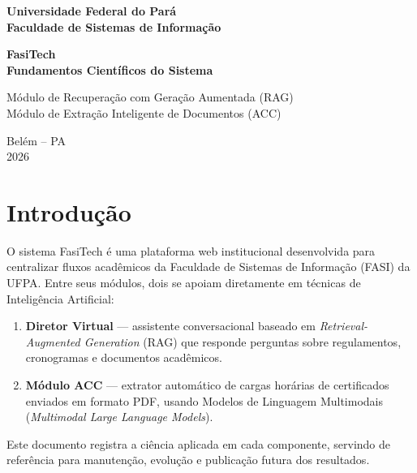 \documentclass[12pt,a4paper]{report}
\begin{document}
\begin{titlepage}
  \centering
  \vspace*{2cm}
  {\Large\bfseries Universidade Federal do Pará\\
  Faculdade de Sistemas de Informação\par}
  \vspace{3cm}
  {\Huge\bfseries FasiTech\\[0.5em]
  \large Fundamentos Científicos do Sistema\par}
  \vspace{2cm}
  {\large
  Módulo de Recuperação com Geração Aumentada (RAG)\\
  Módulo de Extração Inteligente de Documentos (ACC)
  \par}
  \vfill
  {\large Belém -- PA\\2026}
\end{titlepage}

\tableofcontents
\clearpage

\chapter{Introdução}

O sistema FasiTech é uma plataforma web institucional desenvolvida para centralizar
fluxos acadêmicos da Faculdade de Sistemas de Informação (FASI) da UFPA.
Entre seus módulos, dois se apoiam diretamente em técnicas de Inteligência Artificial:

\begin{enumerate}
  \item \textbf{Diretor Virtual} — assistente conversacional baseado em
        \textit{Retrieval-Augmented Generation} (RAG) que responde perguntas
        sobre regulamentos, cronogramas e documentos acadêmicos.
  \item \textbf{Módulo ACC} — extrator automático de cargas horárias de
        certificados enviados em formato PDF, usando Modelos de Linguagem
        Multimodais (\textit{Multimodal Large Language Models}).
\end{enumerate}

Este documento registra a ciência aplicada em cada componente, servindo de
referência para manutenção, evolução e publicação futura dos resultados.

\end{document}

